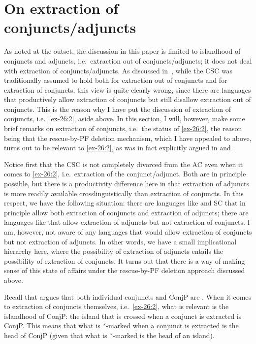 \documentclass[output=paper]{langsci/langscibook}
\begin{document}
\section{On extraction of conjuncts/adjuncts}\label{sec:35.5}

As noted at the outset, the discussion in this paper is limited to islandhood
of conjuncts and adjuncts, i.e.\ extraction out of
conjuncts/adjuncts; it does not deal with extraction of conjuncts/adjuncts. As
discussed in~, while the \gls{CSC} was traditionally assumed to
hold both for extraction out of conjuncts and for extraction of conjuncts, this
view is quite clearly wrong, since there are languages that productively allow
extraction of conjuncts but still disallow extraction out of conjuncts. This is
the reason why I have put the discussion of extraction of conjuncts, i.e.\
\eqref{ex-26:2}, aside above. In this section, I will, however, make some brief
remarks on extraction of conjuncts, i.e.\ the status of \eqref{ex-26:2}, the
reason being that the rescue-by-\gls{PF} deletion mechanism, which I have
appealed to above, turns out to be relevant to \eqref{ex-26:2}, as was in fact
explicitly argued in \textcite{Stjepanovic2014} and \textcite{Oda:2017}.

Notice first that the \gls{CSC} is not
completely divorced from the \gls{AC} even when it comes to \eqref{ex-26:2}, i.e.\
extraction of the conjunct/adjunct. Both are in principle possible, but there
is a productivity difference here in that extraction of adjuncts\is{adjunction}
is more readily available crosslinguistically than extraction of conjuncts. In
this respect, we have the following situation: there are languages like
\ili{Japanese} and \gls{SC} that in principle allow both extraction of
conjuncts and extraction of adjuncts; there are languages like 
that allow extraction of adjuncts but not extraction of
conjuncts.  I am, however, not aware of any languages that would allow
extraction of conjuncts but not extraction of adjuncts\is{adjunction}. In other
words, we have a small implicational hierarchy here, where the possibility of
extraction of adjuncts entails the possibility of extraction of conjuncts. It
turns out that there is a way of making sense of this state of affairs under
the rescue-by-\gls{PF} deletion approach discussed above.

Recall that \textcite{Oda:2017} argues that both individual conjuncts and
ConjP are . When it comes to extraction of conjuncts themselves, i.e.\
\eqref{ex-26:2}, what is relevant is the islandhood of ConjP: the island that is crossed
when a conjunct is extracted is ConjP. This means that what is *-marked when a
conjunct is extracted is the head of ConjP (given that what is *-marked is the
head of an island).
\end{document}
